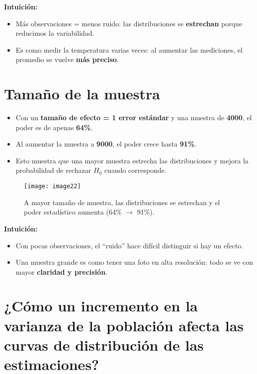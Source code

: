 \documentclass[12pt]{article}
\begin{document}
\textbf{Intuición:}
\begin{itemize}
    \item Más observaciones = menos ruido: las distribuciones se \textbf{estrechan} porque reducimos la variabilidad.
    \item Es como medir la temperatura varias veces: al aumentar las mediciones, el promedio se vuelve \textbf{más preciso}.
\end{itemize}

\section*{\noindent\textbf{Tamaño de la muestra}}

\begin{itemize}
    \item Con un \textbf{tamaño de efecto = 1 error estándar} y una muestra de \textbf{4000}, el poder es de apenas \textbf{64\%}.
    \item Al aumentar la muestra a \textbf{9000}, el poder crece hasta \textbf{91\%}.
    \item Esto muestra que una mayor muestra estrecha las distribuciones y mejora la probabilidad de rechazar $H_0$ cuando corresponde.
\end{itemize}

\begin{figure}[H]
    \centering
    \texttt{[image: image22]}
    \caption{\footnotesize A mayor tamaño de muestra, las distribuciones se estrechan y el poder estadístico aumenta (64\% $\to$ 91\%).}
\end{figure}

\textbf{Intuición:}
\begin{itemize}
    \item Con pocas observaciones, el “ruido” hace difícil distinguir si hay un efecto.  
    \item Una muestra grande es como tener una foto en alta resolución: todo se ve con mayor \textbf{claridad y precisión}.
\end{itemize}

\section*{\noindent\textbf{¿Cómo un incremento en la varianza de la población afecta las curvas de distribución de las estimaciones?}}
\end{document}
